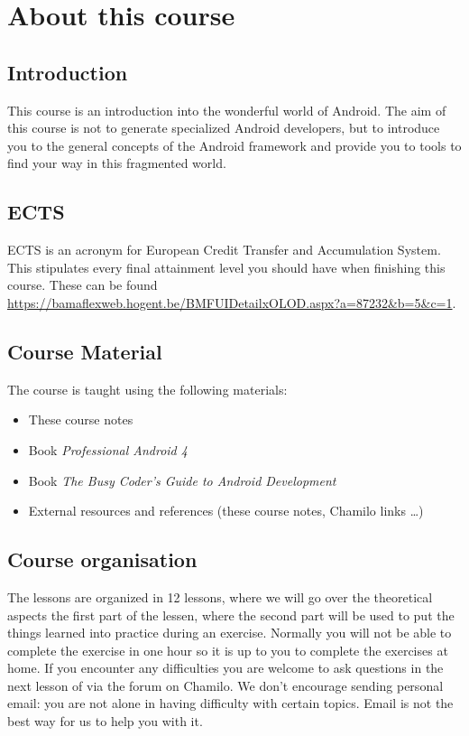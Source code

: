 \chapter{About this course}

\section{Introduction}
This course is an introduction into the wonderful world of Android. The aim of this course is not to generate specialized Android developers, but to introduce you to the general concepts of the Android framework and provide you to tools to find your way in this fragmented world. 

\section{ECTS}
ECTS is an acronym for European Credit Transfer and Accumulation System. This stipulates every final attainment level you should have when finishing this course. These can be found \href{here}{https://bamaflexweb.hogent.be/BMFUIDetailxOLOD.aspx?a=87232\&b=5\&c=1}. 

\section{Course Material}
The course is taught using the following materials:

\begin{itemize}
	\item These course notes
	\item Book \textit{Professional Android 4}  \cite{Reto2017}
	\item Book  \textit{The Busy Coder's Guide to Android Development} \cite{murphymarkl.2017}
	\item External resources and references (these course notes, Chamilo links \dots)
\end{itemize}

\section{Course organisation}
The lessons are organized in 12 lessons, where we will go over the theoretical aspects the first part of the lessen, where the second part will be used to put the things learned into practice during an exercise. Normally you will not be able to complete the exercise in one hour so it is up to you to complete the exercises at home. If you encounter any difficulties  you are welcome to ask questions in the next lesson of via the forum on Chamilo. We don't encourage sending personal email: you are
not alone in having difficulty with certain topics. Email is not the best way for us to help you with it.

